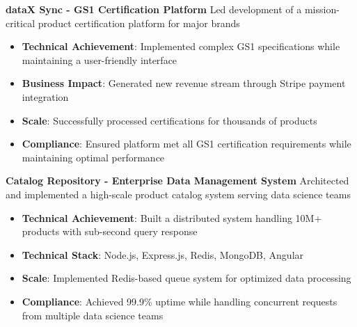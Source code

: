 \documentclass[letterpaper,10pt]{article}
\begin{document}
\vspace{0.4em}\noindent\large\textbf{dataX Sync - GS1 Certification Platform}\newline
\noindent Led development of a mission-critical product certification platform for major brands
\begin{itemize}[leftmargin=*, nosep, itemsep=0.4em, before=\vspace{0.6em}, after=\vspace{0.8em}, label={}]
	\item \textbf{Technical Achievement}: Implemented complex GS1 specifications while maintaining a user-friendly interface
	\item \textbf{Business Impact}: Generated new revenue stream through Stripe payment integration
	\item \textbf{Scale}: Successfully processed certifications for thousands of products
	\item \textbf{Compliance}: Ensured platform met all GS1 certification requirements while maintaining optimal performance
\end{itemize}

\vspace{0.4em}\noindent\large\textbf{Catalog Repository - Enterprise Data Management System}\newline
\noindent Architected and implemented a high-scale product catalog system serving data science teams
\begin{itemize}[leftmargin=*, nosep, itemsep=0.4em, before=\vspace{0.6em}, after=\vspace{0.8em}, label={}]
	\item \textbf{Technical Achievement}: Built a distributed system handling 10M+ products with sub-second query response
	\item \textbf{Technical Stack}: Node.js, Express.js, Redis, MongoDB, Angular
	\item \textbf{Scale}: Implemented Redis-based queue system for optimized data processing
	\item \textbf{Compliance}: Achieved 99.9\% uptime while handling concurrent requests from multiple data science teams
\end{itemize}
\end{document}
